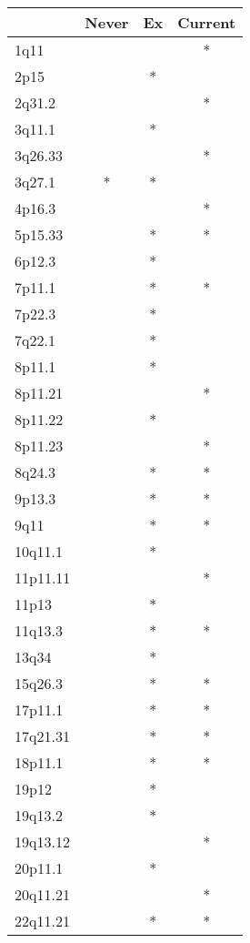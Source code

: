 \begin{tabular}{lccc}
\toprule
{} & Never & Ex & Current \\
\midrule
1q11     &       &    &       * \\
2p15     &       &  * &         \\
2q31.2   &       &    &       * \\
3q11.1   &       &  * &         \\
3q26.33  &       &    &       * \\
3q27.1   &     * &  * &         \\
4p16.3   &       &    &       * \\
5p15.33  &       &  * &       * \\
6p12.3   &       &  * &         \\
7p11.1   &       &  * &       * \\
7p22.3   &       &  * &         \\
7q22.1   &       &  * &         \\
8p11.1   &       &  * &         \\
8p11.21  &       &    &       * \\
8p11.22  &       &  * &         \\
8p11.23  &       &    &       * \\
8q24.3   &       &  * &       * \\
9p13.3   &       &  * &       * \\
9q11     &       &  * &       * \\
10q11.1  &       &  * &         \\
11p11.11 &       &    &       * \\
11p13    &       &  * &         \\
11q13.3  &       &  * &       * \\
13q34    &       &  * &         \\
15q26.3  &       &  * &       * \\
17p11.1  &       &  * &       * \\
17q21.31 &       &  * &       * \\
18p11.1  &       &  * &       * \\
19p12    &       &  * &         \\
19q13.2  &       &  * &         \\
19q13.12 &       &    &       * \\
20p11.1  &       &  * &         \\
20q11.21 &       &    &       * \\
22q11.21 &       &  * &       * \\
\bottomrule
\end{tabular}
